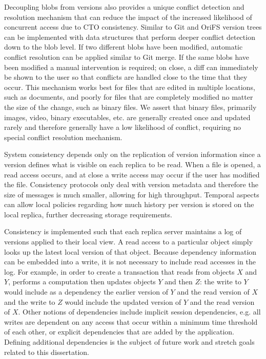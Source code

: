 \documentclass{article}
\begin{document}
Decoupling blobs from versions also provides a unique conflict detection and resolution mechanism that can reduce the impact of the increased likelihood of concurrent access due to CTO consistency. Similar to Git and OriFS \cite{mashtizadeh_replication_2013} version trees can be implemented with data structures that perform deeper conflict detection down to the blob level. If two different blobs have been modified, automatic conflict resolution can be applied similar to Git merge. If the same blobs have been modified a manual intervention is required; on close, a diff can immediately be shown to the user so that conflicts are handled close to the time that they occur. This mechanism works best for files that are edited in multiple locations, such as documents, and poorly for files that are completely modified no matter the size of the change, such as binary files. We assert that binary files, primarily images, video, binary executables, etc. are generally created once and updated rarely and therefore generally have a low likelihood of conflict, requiring no special conflict resolution mechanism.

System consistency depends only on the replication of version information since a version defines what is visible on each replica to be read. When a file is opened, a read access occurs, and at close a write access may occur if the user has modified the file. Consistency protocols only deal with version metadata and therefore the size of messages is much smaller, allowing for high throughput. Temporal aspects can allow local policies regarding how much history per version is stored on the local replica, further decreasing storage requirements.

Consistency is implemented such that each replica server maintains a log of versions applied to their local view. A read access to a particular object simply looks up the latest local version of that object. Because dependency information can be embedded into a write, it is not necessary to include read accesses in the log. For example, in order to create a transaction that reads from objects $X$ and $Y$, performs a computation then updates objects $Y$ and then $Z$: the write to $Y$ would include as a dependency the earlier version of $Y$ and the read version of $X$ and the write to $Z$ would include the updated version of $Y$ and the read version of $X$. Other notions of dependencies include implicit session dependencies, e.g. all writes are dependent on any access that occur within a minimum time threshold of each other, or explicit dependencies that are added by the application. Defining additional dependencies is the subject of future work and stretch goals related to this dissertation.
\end{document}
